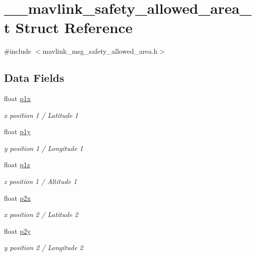 \hypertarget{struct____mavlink__safety__allowed__area__t}{\section{\-\_\-\-\_\-mavlink\-\_\-safety\-\_\-allowed\-\_\-area\-\_\-t Struct Reference}
\label{struct____mavlink__safety__allowed__area__t}
}


{\ttfamily \#include $<$mavlink\-\_\-msg\-\_\-safety\-\_\-allowed\-\_\-area.\-h$>$}

\subsection*{Data Fields}
\begin{DoxyCompactItemize}
\item 
float \hyperlink{struct____mavlink__safety__allowed__area__t_ae919b7b7d619c59c1cd250efb99b0417}{p1x}
\begin{DoxyCompactList}\small\item\em x position 1 / Latitude 1 \end{DoxyCompactList}\item 
float \hyperlink{struct____mavlink__safety__allowed__area__t_a31433025a6ccc7032b9142172824339a}{p1y}
\begin{DoxyCompactList}\small\item\em y position 1 / Longitude 1 \end{DoxyCompactList}\item 
float \hyperlink{struct____mavlink__safety__allowed__area__t_ad1c4edfad8de3bcc22fa3c18d14fc101}{p1z}
\begin{DoxyCompactList}\small\item\em z position 1 / Altitude 1 \end{DoxyCompactList}\item 
float \hyperlink{struct____mavlink__safety__allowed__area__t_a6a558f454d61143884a162cf3710308e}{p2x}
\begin{DoxyCompactList}\small\item\em x position 2 / Latitude 2 \end{DoxyCompactList}\item 
float \hyperlink{struct____mavlink__safety__allowed__area__t_a4e149f8f37b1d5987602ac3e49a65a66}{p2y}
\begin{DoxyCompactList}\small\item\em y position 2 / Longitude 2 \end{DoxyCompactList}\item 

\end{DoxyCompactItemize}
